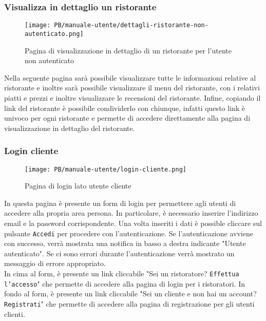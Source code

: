 \subsubsection{Visualizza in dettaglio un ristorante}

\begin{figure}[htbp]
    \centering
	\texttt{[image: PB/manuale-utente/dettagli-ristorante-non-autenticato.png]}
    \caption{Pagina di visualizzazione in dettaglio di un ristorante per l'utente non autenticato}
\end{figure}

Nella seguente pagina sarà possibile visualizzare tutte le informazioni relative 
al ristorante e inoltre sarà possibile visualizzare il menu del ristorante, con 
i relativi piatti e prezzi e inoltre visualizzare le recensioni del ristorante.
Infine, copiando il link del ristorante è possibile condividerlo con chiunque,
infatti questo link è univoco per ogni ristorante e permette di accedere 
direttamente alla pagina di visualizzazione in dettaglio del ristorante.

\subsubsection{Login cliente}

\begin{figure}[htbp]
    \centering
	\texttt{[image: PB/manuale-utente/login-cliente.png]}
    \caption{Pagina di login lato utente cliente}
\end{figure}

In questa pagina è presente un form di login per permettere agli utenti di
accedere alla propria area persona. In particolare, è necessario inserire
l'indirizzo email e la password corrispondente. Una volta inseriti i dati è
possible cliccare sul pulsante \texttt{Accedi} per procedere con 
l'autenticazione. Se l'autenticazione avviene con successo, verrà mostrata una
notifica in basso a destra indicante "Utente autenticato". Se ci sono errori
durante l'autenticazione verrà mostrato un messaggio di errore appropriato.\\
In cima al form, è presente un link cliccabile "Sei un ristoratore?
\texttt{Effettua l'accesso}" che permette di accedere alla pagina di login per
i ristoratori. In fondo al form, è presente un link cliccabile "Sei un cliente e 
non hai un account? \texttt{Registrati}" che permette di accedere alla pagina di 
registrazione per gli utenti clienti.

